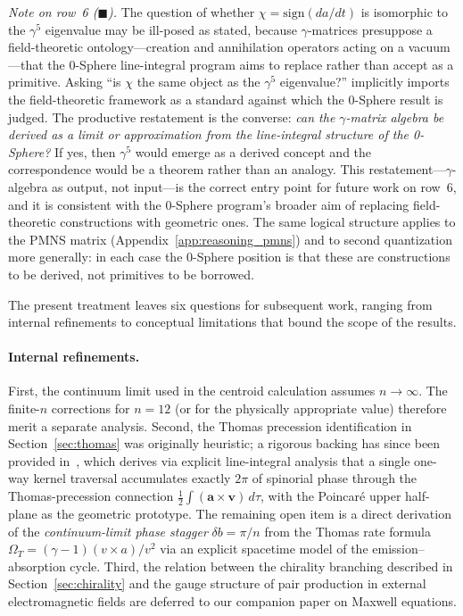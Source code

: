 \documentclass[%
 reprint, amsmath,amssymb, aps, prb, ]{revtex4-2}
\numberwithin{equation}{section}
\begin{document}
\begin{table}[ht]
\begin{minipage}{0.95\textwidth}
\smallskip
\textit{Note on row~6 ($\blacksquare$).} The question of whether $\chi = \mathrm{sign}(da/dt)$ is isomorphic to the $\gamma^5$ eigenvalue may be ill-posed as stated, because $\gamma$-matrices presuppose a field-theoretic ontology---creation and annihilation operators acting on a vacuum---that the 0-Sphere line-integral program aims to replace rather than accept as a primitive. Asking ``is $\chi$ the same object as the $\gamma^5$ eigenvalue?'' implicitly imports the field-theoretic framework as a standard against which the 0-Sphere result is judged. The productive restatement is the converse: \emph{can the $\gamma$-matrix algebra be derived as a limit or approximation from the line-integral structure of the 0-Sphere?} If yes, then $\gamma^5$ would emerge as a derived concept and the correspondence would be a theorem rather than an analogy. This restatement---$\gamma$-algebra as output, not input---is the correct entry point for future work on row~6, and it is consistent with the 0-Sphere program's broader aim of replacing field-theoretic constructions with geometric ones. The same logical structure applies to the PMNS matrix (Appendix~\ref{app:reasoning_pmns}) and to second quantization more generally: in each case the 0-Sphere position is that these are constructions to be derived, not primitives to be borrowed.
\end{minipage}
\end{table}

The present treatment leaves six questions for subsequent work, ranging from internal refinements to conceptual limitations that bound the scope of the results.

\paragraph{Internal refinements.}
First, the continuum limit used in the centroid calculation assumes $n \to \infty$. The finite-$n$ corrections for $n = 12$ (or for the physically appropriate value) therefore merit a separate analysis. Second, the Thomas precession identification in Section~\ref{sec:thomas} was originally heuristic; a rigorous backing has since been provided in~\cite{hanamura29}, which derives via explicit line-integral analysis that a single one-way kernel traversal accumulates exactly $2\pi$ of spinorial phase through the Thomas-precession connection $\tfrac{1}{2}\int(\mathbf{a}\times\mathbf{v})\,d\tau$, with the Poincar\'{e} upper half-plane as the geometric prototype. The remaining open item is a direct derivation of the \emph{continuum-limit phase stagger} $\delta b = \pi/n$ from the Thomas rate formula $\Omega_T = (\gamma-1)(v\times a)/v^2$ via an explicit spacetime model of the emission--absorption cycle. Third, the relation between the chirality branching described in Section~\ref{sec:chirality} and the gauge structure of pair production in external electromagnetic fields are deferred to our companion paper on Maxwell equations.
\end{document}
